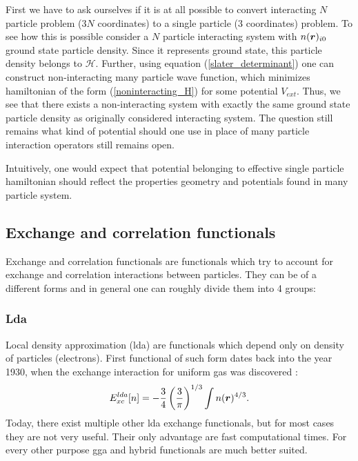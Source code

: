 \documentclass[openany, longbibliography,slovene,a4paper,12pt]{article}
\def\vec#1{\mbox{\boldmath$#1$}}
\begin{document}
First we have to ask ourselves if it is at all possible to convert interacting
$N$ particle problem ($3N$ coordinates) to a single particle (3 coordinates)
problem. To see how this is possible consider a $N$ particle interacting system
with $n(\vec r)_{i0}$ ground state particle density. Since it represents ground
state,  this particle density belongs to $\mathcal H$. Further, using equation
(\ref{slater_determinant}) one can construct non-interacting many particle wave
function, which minimizes hamiltonian of the form (\ref{noninteracting_H})
for some potential $V_{ext}$. Thus, we see that there exists a non-interacting
system with exactly the same ground state particle density as originally
considered interacting system. The question still remains what kind of potential
should one use in
place of many particle interaction operators still remains open.

Intuitively, one would expect that potential belonging to effective single
particle hamiltonian should reflect the properties geometry and potentials found
in many particle system.

\subsection{Exchange and correlation functionals}
Exchange and correlation functionals are functionals which try to account for
exchange and correlation interactions between particles. They can be of a
different forms and in general one can roughly divide them into 4 groups:

\subsubsection{Lda}
Local density approximation (lda) are functionals which depend only on
density of particles (electrons). First functional of such form dates back into
the year 1930, when the exchange interaction for uniform gas was discovered \cite{challenges_den_fun_theor}:
\begin{equation} \label{electron_gas_exchange}
E_{xc}^{lda}[n]=-\frac{3}{4}\left( \frac{3}{\pi} \right)^{1/3}\int n(\vec r)^{4/3}.
\end{equation}
Today, there exist multiple other lda exchange functionals, but for most cases
they are not very useful. Their only advantage are fast computational times.
For every other purpose gga and hybrid functionals are much better suited.
\end{document}
